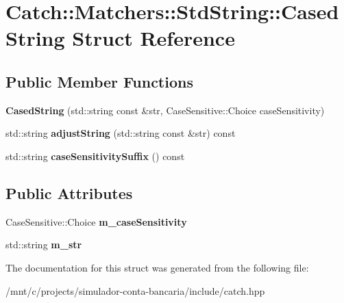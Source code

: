 \hypertarget{structCatch_1_1Matchers_1_1StdString_1_1CasedString}{}\section{Catch\+:\+:Matchers\+:\+:Std\+String\+:\+:Cased\+String Struct Reference}
\label{structCatch_1_1Matchers_1_1StdString_1_1CasedString}
\subsection*{Public Member Functions}
\begin{DoxyCompactItemize}
\item 
\mbox{\label{structCatch_1_1Matchers_1_1StdString_1_1CasedString_aa88bbc5acd2bff22351d8d4b1816b561}} 
{\bfseries Cased\+String} (std\+::string const \&str, Case\+Sensitive\+::\+Choice case\+Sensitivity)
\item 
\mbox{\label{structCatch_1_1Matchers_1_1StdString_1_1CasedString_a77639b1165c01f424ee0e96f53335010}} 
std\+::string {\bfseries adjust\+String} (std\+::string const \&str) const
\item 
\mbox{\label{structCatch_1_1Matchers_1_1StdString_1_1CasedString_a9759155344d696b2476d764a1d95fcc9}} 
std\+::string {\bfseries case\+Sensitivity\+Suffix} () const
\end{DoxyCompactItemize}
\subsection*{Public Attributes}
\begin{DoxyCompactItemize}
\item 
\mbox{\label{structCatch_1_1Matchers_1_1StdString_1_1CasedString_ae1c2864c986941536a6e94cca0528f92}} 
Case\+Sensitive\+::\+Choice {\bfseries m\+\_\+case\+Sensitivity}
\item 
\mbox{\label{structCatch_1_1Matchers_1_1StdString_1_1CasedString_ad05dbc99aba3c3c386d6b856b213f911}} 
std\+::string {\bfseries m\+\_\+str}
\end{DoxyCompactItemize}


The documentation for this struct was generated from the following file\+:\begin{DoxyCompactItemize}
\item 
/mnt/c/projects/simulador-\/conta-\/bancaria/include/catch.\+hpp\end{DoxyCompactItemize}
